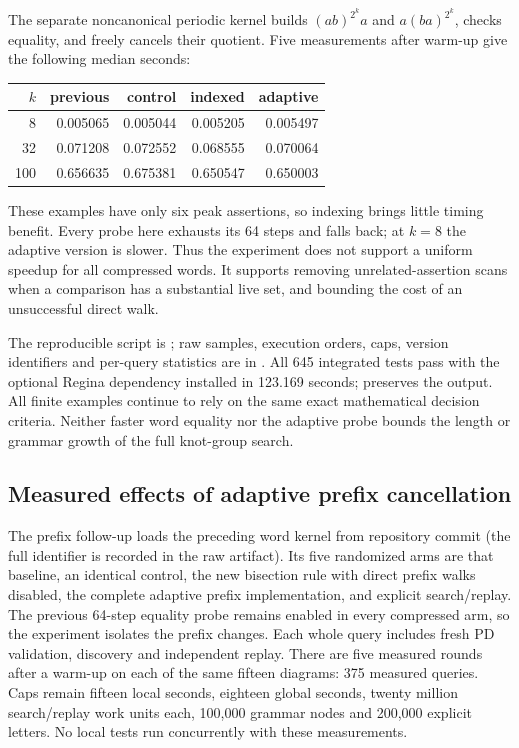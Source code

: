 The separate noncanonical periodic kernel builds
$(ab)^{2^k}a$ and $a(ba)^{2^k}$, checks equality, and freely cancels their
quotient. Five measurements after warm-up give the following median seconds:
\begin{center}
\begin{tabular}{rrrrr}
\toprule
$k$ & previous & control & indexed & adaptive\\
\midrule
8 & 0.005065 & 0.005044 & 0.005205 & 0.005497\\
32 & 0.071208 & 0.072552 & 0.068555 & 0.070064\\
100 & 0.656635 & 0.675381 & 0.650547 & 0.650003\\
\bottomrule
\end{tabular}
\end{center}
These examples have only six peak assertions, so indexing brings little
timing benefit. Every probe here exhausts its 64 steps and falls back;
at $k=8$ the adaptive version is slower. Thus the experiment does not
support a uniform speedup for all compressed words. It supports removing
unrelated-assertion scans when a comparison has a substantial live set,
and bounding the cost of an unsuccessful direct walk.

The reproducible script is ; raw
samples, execution orders, caps, version identifiers and per-query statistics
are in .
All 645 integrated tests pass with the optional Regina dependency installed
in 123.169 seconds; 
preserves the output.
All finite examples continue to rely on the same exact mathematical
decision criteria. Neither faster word equality nor the adaptive probe
bounds the length or grammar growth of the full knot-group search.

\subsection{Measured effects of adaptive prefix cancellation}

The prefix follow-up loads the preceding word kernel from repository commit
 (the full identifier is recorded in the raw artifact).
Its five randomized arms
are that baseline, an identical control, the new bisection rule with direct
prefix walks disabled, the complete adaptive prefix implementation, and
explicit search/replay. The previous 64-step equality probe remains enabled
in every compressed arm, so the experiment isolates the prefix changes.
Each whole query includes fresh PD validation, discovery and independent
replay. There are five measured rounds after a warm-up on each of the same
fifteen diagrams: 375 measured queries. Caps remain fifteen local seconds,
eighteen global seconds, twenty million search/replay work units each,
100,000 grammar nodes and 200,000 explicit letters. No local tests run
concurrently with these measurements.

